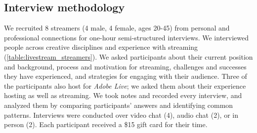 \subsection{Interview methodology}
We recruited 8 streamers (4 male, 4 female, ages 20-45) from personal and professional connections for one-hour semi-structured interviews. We interviewed people across creative disciplines and experience with streaming (\autoref{table:livestream_streamers}). We asked participants about their current position and background, process and motivation for streaming, challenges and successes they have experienced, and strategies for engaging with their audience. Three of the participants also host for \textit{Adobe Live}; we asked them about their experience hosting as well as streaming. We took notes and recorded every interview, and analyzed them by comparing participants' answers and identifying common patterns. Interviews were conducted over video chat (4), audio chat (2), or in person (2). Each participant received a \$15 gift card for their time. 


